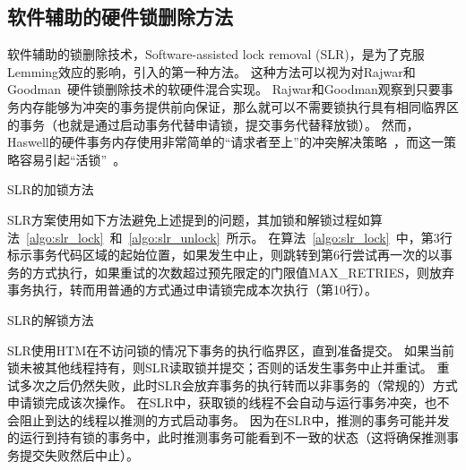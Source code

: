\subsection{软件辅助的硬件锁删除方法}
软件辅助的锁删除技术，Software-assisted lock removal (SLR)，是为了克服Lemming效应的影响，引入的第一种方法。
这种方法可以视为对Rajwar和Goodman~\cite{Rajwar2002Transactional}硬件锁删除技术的软硬件混合实现。
Rajwar和Goodman观察到只要事务内存能够为冲突的事务提供前向保证，那么就可以不需要锁执行具有相同临界区的事务（也就是通过启动事务代替申请锁，提交事务代替释放锁）。
然而，Haswell的硬件事务内存使用非常简单的“请求者至上”的冲突解决策略~\cite{2011Intel}，而这一策略容易引起“活锁”~\cite{Bobba2007Performance}。

\begin{algorithm}[htbp]
\SetAlgoLined
{}
\caption{SLR的加锁方法}
\label{algo:slr_lock}
\end{algorithm}

SLR方案使用如下方法避免上述提到的问题，其加锁和解锁过程如算法~\ref{algo:slr_lock}~和~\ref{algo:slr_unlock}~所示。
在算法~\ref{algo:slr_lock}~中，第3行标示事务代码区域的起始位置，如果发生中止，则跳转到第6行尝试再一次的以事务的方式执行，如果重试的次数超过预先限定的门限值MAX\_RETRIES，则放弃事务执行，转而用普通的方式通过申请锁完成本次执行（第10行）。

\begin{algorithm}[htbp]
\SetAlgoLined
{}
\caption{SLR的解锁方法}
\label{algo:slr_unlock}
\end{algorithm}

SLR使用HTM在不访问锁的情况下事务的执行临界区，直到准备提交。
如果当前锁未被其他线程持有，则SLR读取锁并提交；否则的话发生事务中止并重试。
重试多次之后仍然失败，此时SLR会放弃事务的执行转而以非事务的（常规的）方式申请锁完成该次操作。
在SLR中，获取锁的线程不会自动与运行事务冲突，也不会阻止到达的线程以推测的方式启动事务。
因为在SLR中，推测的事务可能并发的运行到持有锁的事务中，此时推测事务可能看到不一致的状态（这将确保推测事务提交失败然后中止）。

